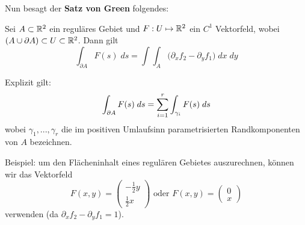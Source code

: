Nun besagt der \textbf{Satz von Green} folgendes:
\begin{tcolorbox}
    Sei $A \subset \mathbb{R}^2$ ein reguläres Gebiet und $F: U \mapsto \mathbb{R}^2$ ein $C^1$ Vektorfeld, wobei 
    $(A \cup \partial A) \subset U \subset \mathbb{R}^2$. Dann gilt
    $$\int_{\partial A} F(s) \; ds = \int \int_A \Big(\partial_x f_2 - \partial_y f_1 \Big) \; dx \; dy$$
\end{tcolorbox}

Explizit gilt:
$$\int_{\partial A} F(s) \; ds = \sum\limits_{i = 1}^r \int_{\gamma_i} F(s) \; ds$$
wobei $\gamma_1, ..., \gamma_r$ die im positiven Umlaufsinn parametrisierten Randkomponenten von $A$ 
bezeichnen. \medskip

Beispiel: um den Flächeninhalt eines regulären Gebietes auszurechnen, können wir das Vektorfeld 
$$F(x,y) = \begin{pmatrix}
    -\frac{1}{2} y\\
    \frac{1}{2} x
  \end{pmatrix} \text{ oder } F(x,y) = \begin{pmatrix}
    0\\
    x
  \end{pmatrix}$$
verwenden (da $\partial_x f_2 - \partial_y f_1 = 1$). 


\vfill\null
\columnbreak
